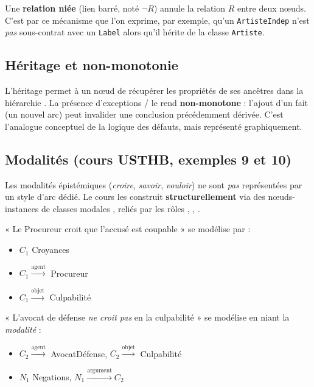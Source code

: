 \noindent Une \textbf{relation niée} (lien barré, noté $\lnot R$) annule la
relation $R$ entre deux nœuds. C'est par ce mécanisme que l'on exprime, par
exemple, qu'un \texttt{ArtisteIndep} n'est \emph{pas} sous-contrat avec un
\texttt{Label} alors qu'il hérite de la classe \texttt{Artiste}.

\subsection{Héritage et non-monotonie}

L'héritage permet à un nœud de récupérer les propriétés de ses ancêtres dans la
hiérarchie . La présence d'exceptions / le rend
\textbf{non-monotone} : l'ajout d'un fait (un nouvel arc) peut invalider une
conclusion précédemment dérivée. C'est l'analogue conceptuel de la logique des
défauts, mais représenté graphiquement.

\subsection{Modalités (cours USTHB, exemples 9 et 10)}

Les modalités épistémiques (\emph{croire}, \emph{savoir}, \emph{vouloir}) ne
sont \emph{pas} représentées par un style d'arc dédié. Le cours les construit
\textbf{structurellement} via des nœuds-instances de classes modales
,  reliés par les rôles ,
, .

\begin{tcolorbox}[notebox, title={Construction modale partitionnée}]
« Le Procureur croit que l'accusé est coupable » se modélise par :
\begin{itemize}
  \item $C_1$  Croyances
  \item $C_1 \xrightarrow{\text{agent}}$ Procureur
  \item $C_1 \xrightarrow{\text{objet}}$ Culpabilité
\end{itemize}

\noindent « L'avocat de défense \emph{ne croit pas} en la culpabilité » se modélise
en niant la \emph{modalité} :
\begin{itemize}
  \item $C_2 \xrightarrow{\text{agent}}$ AvocatDéfense, $C_2 \xrightarrow{\text{objet}}$ Culpabilité
  \item $N_1$  Negations, $N_1 \xrightarrow{\text{argument}} C_2$
\end{itemize}
\end{tcolorbox}


